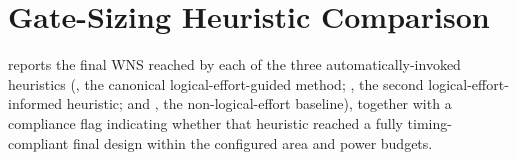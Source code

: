 \section{Gate-Sizing Heuristic Comparison}
\label{sec:res-heuristics}

 reports the final WNS reached by each of the
three automatically-invoked heuristics (,
the canonical logical-effort-guided method; ,
the second logical-effort-informed heuristic; and , the
non-logical-effort baseline), together with a compliance flag indicating
whether that heuristic reached a fully timing-compliant final design within
the configured area and power budgets.

\begin{center}
    


\end{center}
